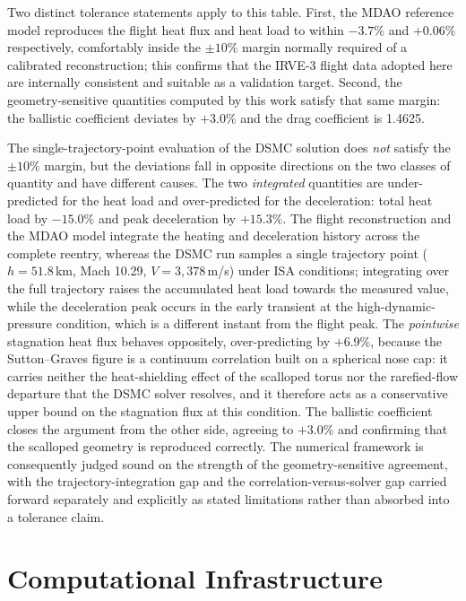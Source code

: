 Two distinct tolerance statements apply to this table. First, the MDAO reference model reproduces the flight heat flux and heat load to within $-3.7\%$ and $+0.06\%$ respectively, comfortably inside the $\pm 10\%$ margin normally required of a calibrated reconstruction; this confirms that the IRVE-3 flight data adopted here are internally consistent and suitable as a validation target. Second, the geometry-sensitive quantities computed by this work satisfy that same margin: the ballistic coefficient deviates by $+3.0\%$ and the drag coefficient is 1.4625.

The single-trajectory-point evaluation of the DSMC solution does \emph{not} satisfy the $\pm 10\%$ margin, but the deviations fall in opposite directions on the two classes of quantity and have different causes. The two \emph{integrated} quantities are under-predicted for the heat load and over-predicted for the deceleration: total heat load by $-15.0\%$ and peak deceleration by $+15.3\%$. The flight reconstruction and the MDAO model integrate the heating and deceleration history across the complete reentry, whereas the DSMC run samples a single trajectory point ($h = 51.8$\,km, Mach 10.29, $V = 3{,}378$\,m/s) under ISA conditions; integrating over the full trajectory raises the accumulated heat load towards the measured value, while the deceleration peak occurs in the early transient at the high-dynamic-pressure condition, which is a different instant from the flight peak. The \emph{pointwise} stagnation heat flux behaves oppositely, over-predicting by $+6.9\%$, because the Sutton--Graves figure is a continuum correlation built on a spherical nose cap: it carries neither the heat-shielding effect of the scalloped torus nor the rarefied-flow departure that the DSMC solver resolves, and it therefore acts as a conservative upper bound on the stagnation flux at this condition. The ballistic coefficient closes the argument from the other side, agreeing to $+3.0\%$ and confirming that the scalloped geometry is reproduced correctly. The numerical framework is consequently judged sound on the strength of the geometry-sensitive agreement, with the trajectory-integration gap and the correlation-versus-solver gap carried forward separately and explicitly as stated limitations rather than absorbed into a tolerance claim.

\section{Computational Infrastructure}

